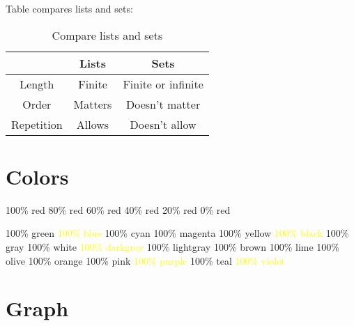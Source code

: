 \documentclass[12pt, letterpaper, oneside]{article}
\begin{document}
Table compares lists and sets:
\begin{table}[H]
\centering
\begin{tabular}{||c c c ||}
 \hline
   & Lists & Sets \\ [0.5ex]
 \hline
 \hline
 Length & Finite & Finite or infinite \\
 Order & Matters & Doesn't matter \\
 Repetition & Allows & Doesn't allow \\ [1ex]
 \hline
\end{tabular}
\caption{Compare lists and sets}
\label{table:lists_sets_comp}
\end{table}

\section{Colors}

\colorbox{red!100}{100\% red}
\colorbox{red!80}{80\% red}
\colorbox{red!60}{60\% red}
\colorbox{red!40}{40\% red}
\colorbox{red!20}{20\% red}
\colorbox{red!0}{0\% red}

\colorbox{green!100}{100\% green}
\colorbox{blue!100}{\textcolor{yellow}{100\% blue}}
\colorbox{cyan!100}{100\% cyan}
\colorbox{magenta!100}{100\% magenta}
\colorbox{yellow!100}{100\% yellow}
\colorbox{black!100}{\textcolor{yellow}{100\% black}}
\colorbox{gray!100}{100\% gray}
\colorbox{white!100}{100\% white}
\colorbox{darkgray!100}{\textcolor{yellow}{100\% darkgray}}
\colorbox{lightgray!100}{100\% lightgray}
\colorbox{brown!100}{100\% brown}
\colorbox{lime!100}{100\% lime}
\colorbox{olive!100}{100\% olive}
\colorbox{orange!100}{100\% orange}
\colorbox{pink!100}{100\% pink}
\colorbox{purple!100}{\textcolor{yellow}{100\% purple}}
\colorbox{teal!100}{100\% teal}
\colorbox{violet!100}{\textcolor{yellow}{100\% violet}}

\section{Graph}

\end{document}
